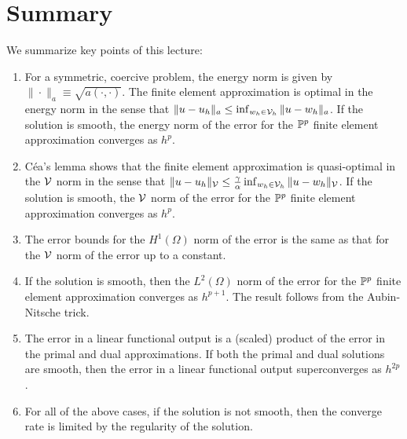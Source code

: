 \section{Summary}
We summarize key points of this lecture:
\begin{enumerate}
\item For a symmetric, coercive problem, the energy norm is given by $\| \cdot \|_a \equiv \sqrt{a(\cdot,\cdot)}$.  The finite element approximation is optimal in the energy norm in the sense that $\| u - u_h \|_a \leq \inf_{w_h \in \mathcal{V}_h} \| u - w_h \|_a$.  If the solution is smooth, the energy norm of the error for the $\mathbb{P}^p$ finite element approximation converges as $h^p$.
\item C\'ea's lemma shows that the finite element approximation is quasi-optimal in the $\mathcal{V}$ norm in the sense that $\| u - u_h \|_{\mathcal{V}} \leq \frac{\gamma}{\alpha} \inf_{w_h \in \mathcal{V}_h} \| u - w_h \|_{\mathcal{V}}$.  If the solution is smooth, the $\mathcal{V}$  norm of the error for the $\mathbb{P}^p$ finite element approximation converges as $h^p$.
\item The error bounds for the $H^1(\Omega)$ norm of the error is the same as that for the $\mathcal{V}$ norm of the error up to a constant.
\item If the solution is smooth, then the $L^2(\Omega)$ norm of the error for the $\mathbb{P}^p$ finite element approximation converges as $h^{p+1}$.  The result follows from the Aubin-Nitsche trick.
\item The error in a linear functional output is a (scaled) product of the error in the primal and dual approximations. If both the primal and dual solutions are smooth, then the error in a linear functional output superconverges as $h^{2p}$.
\item For all of the above cases, if the solution is not smooth, then the converge rate is limited by the regularity of the solution.
\end{enumerate}
